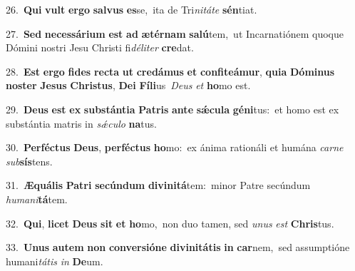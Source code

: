 {{\numbfont\textcolor{\numbcolor}{26.}}~\textbf{Qui} \textbf{vult} \textbf{er}\-\textbf{go} \textbf{sal}\-\textbf{vus} \textbf{es}\-se,~\star ita de Tri\-\textit{ni}\-\textit{tá}\textit{te} \textbf{sén}\-tiat.\par
{\numbfont\textcolor{\numbcolor}{27.}}~\textbf{Sed} \textbf{ne}\-\textbf{ces}\textbf{sá}\textbf{ri}\textbf{um} \textbf{est} \textbf{ad} \textbf{æ}\-\textbf{tér}\textbf{nam} \textbf{sa}\-\textbf{lú}tem,~\star ut Incarnatiónem quoque Dómini nostri Jesu Christi fi\-\textit{dé}\-\textit{li}\textit{ter} \textbf{cre}\-dat.\par
{\numbfont\textcolor{\numbcolor}{28.}}~\textbf{Est} \textbf{er}\-\textbf{go} \textbf{fi}\-\textbf{des} \textbf{rec}\-\textbf{ta} \textbf{ut} \textbf{cre}\-\textbf{dá}\textbf{mus} \textbf{et} \textbf{con}\-\textbf{fi}\textbf{te}\textbf{á}\textbf{mur}, \textbf{qui}\-\textbf{a} \textbf{Dó}\-\textbf{mi}\textbf{nus} \textbf{nos}\-\textbf{ter} \textbf{Je}\-\textbf{sus} \textbf{Chris}\-\textbf{tus}, \textbf{De}\-\textbf{i} \textbf{Fí}\-\textbf{li}us~\star \textit{De}\-\textit{us} \textit{et} \textbf{ho}\-mo est.\par
{\numbfont\textcolor{\numbcolor}{29.}}~\-\textbf{De}\-\textbf{us} \textbf{est} \textbf{ex} \textbf{sub}\-\textbf{stán}\textbf{ti}\textbf{a} \textbf{Pa}\-\textbf{tris} \textbf{an}\-\textbf{te} \textbf{sǽ}\-\textbf{cu}\textbf{la} \textbf{gé}\-\textbf{ni}tus:~\star et homo est ex substántia matris in \textit{sǽ}\-\textit{cu}\textit{lo} \textbf{na}\-tus.\par
{\numbfont\textcolor{\numbcolor}{30.}}~\-\textbf{Per}\-\textbf{féc}\textbf{tus} \textbf{De}\-\textbf{us}, \textbf{per}\-\textbf{féc}\textbf{tus} \textbf{ho}\-mo:~\star ex ánima rationáli et humána \textit{car}\-\textit{ne} \textit{sub}\-\textbf{sís}tens.\par
{\numbfont\textcolor{\numbcolor}{31.}}~\-\textbf{Æ}\-\textbf{quá}\textbf{lis} \textbf{Pa}\-\textbf{tri} \textbf{se}\-\textbf{cún}\textbf{dum} \textbf{di}\-\textbf{vi}\textbf{ni}\textbf{tá}tem:~\star minor Patre secúndum \textit{hu}\-\textit{ma}\textit{ni}\textbf{tá}tem.\par
{\numbfont\textcolor{\numbcolor}{32.}}~\-\textbf{Qui}\-, \textbf{li}\-\textbf{cet} \textbf{De}\-\textbf{us} \textbf{sit} \textbf{et} \textbf{ho}\-mo,~\star non duo tamen, sed \textit{u}\-\textit{nus} \textit{est} \textbf{Chris}\-tus.\par
{\numbfont\textcolor{\numbcolor}{33.}}~\-\textbf{U}\-\textbf{nus} \textbf{au}\-\textbf{tem} \textbf{non} \textbf{con}\-\textbf{ver}\textbf{si}\textbf{ó}\textbf{ne} \textbf{di}\-\textbf{vi}\textbf{ni}\textbf{tá}\textbf{tis} \textbf{in} \textbf{car}\-nem,~\star sed assumptióne humani\-\textit{tá}\-\textit{tis} \textit{in} \textbf{De}\-um.\par
}
